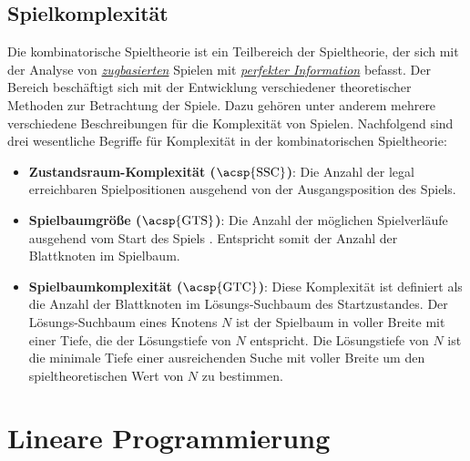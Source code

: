 \subsection{Spielkomplexität}

Die kombinatorische Spieltheorie ist ein Teilbereich der Spieltheorie, der sich mit der Analyse von \hyperref[text:game-theory-sequenziell]{\emph{zugbasierten}} Spielen mit \hyperref[text:game-theory-perfekte-information]{\emph{perfekter Information}} befasst. Der Bereich beschäftigt sich mit der Entwicklung verschiedener theoretischer Methoden zur Betrachtung der Spiele. Dazu gehören unter anderem mehrere verschiedene Beschreibungen für die Komplexität von Spielen. Nachfolgend sind drei wesentliche Begriffe für Komplexität in der kombinatorischen Spieltheorie: 

\pagebreak

\begin{itemize}
    \item \textbf{Zustandsraum-Komplexität ($\text{\acsp{SSC}}$)}: Die Anzahl der legal erreichbaren Spielpositionen ausgehend von der Ausgangsposition des Spiels. \cite[S. 106]{2007.SolvingGames}
    \item \vspace*{-0.2cm} \textbf{Spielbaumgröße ($\text{\acsp{GTS}}$)}: Die Anzahl der möglichen Spielverläufe ausgehend vom Start des Spiels \cite[S. 1]{2019.GameTreeComplexityEstimation}. Entspricht somit der Anzahl der Blattknoten im Spielbaum.
    \item \vspace*{-0.2cm} \textbf{Spielbaumkomplexität ($\text{\acsp{GTC}}$)}: Diese Komplexität ist definiert als die Anzahl der Blattknoten im Lösungs-Suchbaum des Startzustandes. Der Lösungs-Suchbaum eines Knotens $N$ ist der Spielbaum in voller Breite mit einer Tiefe, die der Lösungstiefe von $N$ entspricht. Die Lösungstiefe von $N$ ist die minimale Tiefe einer ausreichenden Suche mit voller Breite um den spieltheoretischen Wert von $N$ zu bestimmen. \cite[S. 299]{2002.GamesSolved}
\end{itemize}

\vspace*{-0.2cm}
\vspace*{-0.15cm}

\section{Lineare Programmierung}
\label{chapter:lineare-programmierung}

